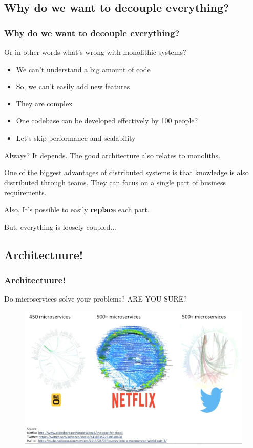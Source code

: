 \subsection{Why do we want to decouple everything?}
\begin{frame}
\frametitle{Why do we want to decouple everything?}\pause
Or in other words what's wrong with monolithic systems?\pause
\begin{itemize}
	\item We can't understand a big amount of code\pause
	\item So, we can't easily add new features\pause
	\item They are complex\pause
	\item One codebase can be developed effectively by 100 people?\pause
	\item Let's skip performance and scalability
\end{itemize}
Always? It depends. The good architecture also relates to monoliths.
\end{frame}

\begin{frame}
One of the biggest advantages of distributed systems is that knowledge is
also distributed through teams. They can focus on a single part of
business requirements.

Also, It's possible to easily \textbf{replace} each part.
\end{frame}

\begin{frame}
But, everything is loosely coupled...
\end{frame}

\subsection{Architectuure!}
\begin{frame}
\frametitle{Architectuure!}
Do microservices solve your problems? ARE YOU SURE?
\begin{figure}
	\centering
	\includegraphics[width=1\linewidth]{pictures/exampleOfMicroservices}
	\label{fig:microservicesexamples}
\end{figure}


\end{frame}

